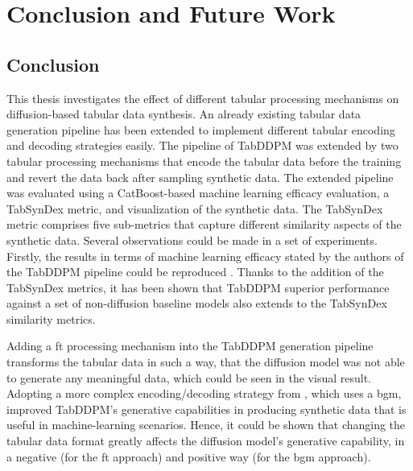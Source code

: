\chapter{Conclusion and Future Work}
\label{ch:conclusion}

\section{Conclusion}
\label{ch:conclusion_}

This thesis investigates the effect of different tabular processing mechanisms on diffusion-based tabular data synthesis.
An already existing tabular data generation pipeline has been extended to implement different tabular encoding and decoding strategies easily.
The pipeline of TabDDPM \cite{kotelnikov2022TabDDPMModellingTabular} was extended by two tabular processing mechanisms that encode the tabular data before the training and revert the data back after sampling synthetic data.
The extended pipeline was evaluated using a CatBoost-based machine learning efficacy evaluation, a TabSynDex metric, and visualization of the synthetic data.
The TabSynDex metric comprises five sub-metrics that capture different similarity aspects of the synthetic data.
Several observations could be made in a set of experiments.
Firstly, the results in terms of machine learning efficacy stated by the authors of the TabDDPM pipeline could be reproduced \cite{kotelnikov2022TabDDPMModellingTabular}.
Thanks to the addition of the TabSynDex metrics, it has been shown that TabDDPM superior performance against a set of non-diffusion baseline models also extends to the TabSynDex similarity metrics.

Adding a \acrfull{ft} processing mechanism into the TabDDPM generation pipeline transforms the tabular data in such a way,
that the diffusion model was not able to generate any meaningful data, which could be seen in the visual result.
Adopting a more complex encoding/decoding strategy from \cite{zhao2022CTABGANEnhancingTabular}, which uses a \acrfull{bgm},
improved TabDDPM's generative capabilities in producing synthetic data that is useful in machine-learning scenarios.
Hence, it could be shown that changing the tabular data format greatly affects the diffusion model's generative capability, in a negative (for the \gls{ft} approach) and positive way (for the \gls{bgm} approach).

